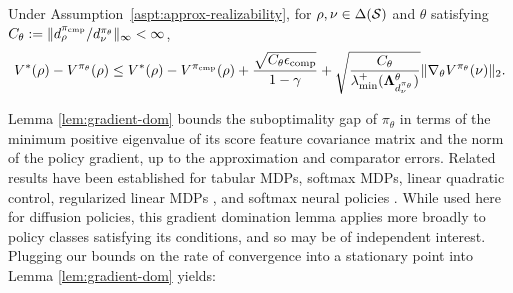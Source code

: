 \begin{lem}\label{lem:gradient-dom}
Under Assumption~\ref{aspt:approx-realizability},
for $\rho,\nu\in\Delta({\mathcal{S}})$ and $\theta$ satisfying
$C_\theta:=\|d_\rho^{\pi_{\rm cmp}}/d_\nu^{\pi_\theta}\|_\infty<\infty$,
\begin{align*}
V^*(\rho)-V^{\pi_\theta}(\rho)
\leq V^*(\rho)-V^{\pi_{\rm cmp}}(\rho)+\frac{\sqrt{C_\theta\epsilon_{\mathrm{comp}}}}{1-\gamma}+\sqrt{\frac{C_\theta}{\lambda_{\min}^+
(\boldsymbol{\Lambda}^\theta_{d_\nu^{\pi_\theta}})}}
\|\nabla_\theta V^{\pi_\theta}(\nu)\|_2.
\end{align*}
\end{lem}
Lemma \ref{lem:gradient-dom} bounds the suboptimality gap of $\pi_\theta$ in terms of the minimum positive eigenvalue of its score feature covariance matrix and the norm of the policy gradient, up to the approximation and comparator errors. Related results have been established for tabular MDPs, softmax MDPs, linear quadratic control, regularized linear MDPs \citep{bhandari2024global}, and softmax neural policies \citep{wang2019neuralpolicygradientmethods}. While used here for diffusion policies, this gradient domination lemma applies more broadly to policy classes satisfying its conditions, and so may be of independent interest.
Plugging our bounds on the rate of convergence into a stationary point into Lemma \ref{lem:gradient-dom} yields:

